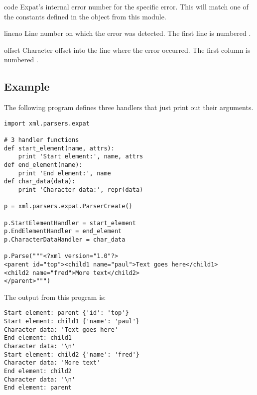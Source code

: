 \begin{memberdesc}[ExpatError]{code}
  Expat's internal error number for the specific error.  This will
  match one of the constants defined in the  object from
  this module.
\end{memberdesc}

\begin{memberdesc}[ExpatError]{lineno}
  Line number on which the error was detected.  The first line is
  numbered .
\end{memberdesc}

\begin{memberdesc}[ExpatError]{offset}
  Character offset into the line where the error occurred.  The first
  column is numbered .
\end{memberdesc}


\subsection{Example \label{expat-example}}

The following program defines three handlers that just print out their
arguments.

\begin{verbatim}
import xml.parsers.expat

# 3 handler functions
def start_element(name, attrs):
    print 'Start element:', name, attrs
def end_element(name):
    print 'End element:', name
def char_data(data):
    print 'Character data:', repr(data)

p = xml.parsers.expat.ParserCreate()

p.StartElementHandler = start_element
p.EndElementHandler = end_element
p.CharacterDataHandler = char_data

p.Parse("""<?xml version="1.0"?>
<parent id="top"><child1 name="paul">Text goes here</child1>
<child2 name="fred">More text</child2>
</parent>""")
\end{verbatim}

The output from this program is:

\begin{verbatim}
Start element: parent {'id': 'top'}
Start element: child1 {'name': 'paul'}
Character data: 'Text goes here'
End element: child1
Character data: '\n'
Start element: child2 {'name': 'fred'}
Character data: 'More text'
End element: child2
Character data: '\n'
End element: parent
\end{verbatim}


